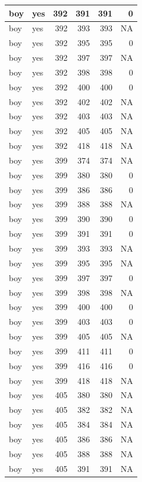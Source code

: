 \documentclass[man]{apa6}
\begin{document}
\begin{tabular}{l|l|r|r|r|r}
\hline
boy & yes & 392 & 391 & 391 & 0\\
\hline
boy & yes & 392 & 393 & 393 & NA\\
\hline
boy & yes & 392 & 395 & 395 & 0\\
\hline
boy & yes & 392 & 397 & 397 & NA\\
\hline
boy & yes & 392 & 398 & 398 & 0\\
\hline
boy & yes & 392 & 400 & 400 & 0\\
\hline
boy & yes & 392 & 402 & 402 & NA\\
\hline
boy & yes & 392 & 403 & 403 & NA\\
\hline
boy & yes & 392 & 405 & 405 & NA\\
\hline
boy & yes & 392 & 418 & 418 & NA\\
\hline
boy & yes & 399 & 374 & 374 & NA\\
\hline
boy & yes & 399 & 380 & 380 & 0\\
\hline
boy & yes & 399 & 386 & 386 & 0\\
\hline
boy & yes & 399 & 388 & 388 & NA\\
\hline
boy & yes & 399 & 390 & 390 & 0\\
\hline
boy & yes & 399 & 391 & 391 & 0\\
\hline
boy & yes & 399 & 393 & 393 & NA\\
\hline
boy & yes & 399 & 395 & 395 & NA\\
\hline
boy & yes & 399 & 397 & 397 & 0\\
\hline
boy & yes & 399 & 398 & 398 & NA\\
\hline
boy & yes & 399 & 400 & 400 & 0\\
\hline
boy & yes & 399 & 403 & 403 & 0\\
\hline
boy & yes & 399 & 405 & 405 & NA\\
\hline
boy & yes & 399 & 411 & 411 & 0\\
\hline
boy & yes & 399 & 416 & 416 & 0\\
\hline
boy & yes & 399 & 418 & 418 & NA\\
\hline
boy & yes & 405 & 380 & 380 & NA\\
\hline
boy & yes & 405 & 382 & 382 & NA\\
\hline
boy & yes & 405 & 384 & 384 & NA\\
\hline
boy & yes & 405 & 386 & 386 & NA\\
\hline
boy & yes & 405 & 388 & 388 & NA\\
\hline
boy & yes & 405 & 391 & 391 & NA\\

\end{tabular}
\end{document}
